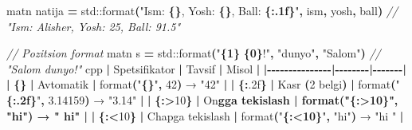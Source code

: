 \documentclass[a4paper,11pt,twoside,openright]{book}
\newenvironment{Shaded}{\begin{snugshade}}{\end{snugshade}}
\newcommand{\BuiltInTok}[1]{#1}
\newcommand{\CharTok}[1]{\textcolor[rgb]{0.31,0.60,0.02}{#1}}
\newcommand{\CommentTok}[1]{\textcolor[rgb]{0.56,0.35,0.01}{\textit{#1}}}
\newcommand{\DecValTok}[1]{\textcolor[rgb]{0.00,0.00,0.81}{#1}}
\newcommand{\ErrorTok}[1]{\textcolor[rgb]{0.64,0.00,0.00}{\textbf{#1}}}
\newcommand{\FloatTok}[1]{\textcolor[rgb]{0.00,0.00,0.81}{#1}}
\newcommand{\NormalTok}[1]{#1}
\newcommand{\OperatorTok}[1]{\textcolor[rgb]{0.81,0.36,0.00}{\textbf{#1}}}
\newcommand{\SpecialCharTok}[1]{\textcolor[rgb]{0.81,0.36,0.00}{\textbf{#1}}}
\newcommand{\StringTok}[1]{\textcolor[rgb]{0.31,0.60,0.02}{#1}}
\begin{document}
\begin{Shaded}
\begin{Highlighting}[]
\NormalTok{matn natija }\OperatorTok{=} \BuiltInTok{std::}\NormalTok{format}\OperatorTok{(}\StringTok{"Ism: }\SpecialCharTok{\{\}}\StringTok{, Yosh: }\SpecialCharTok{\{\}}\StringTok{, Ball: }\SpecialCharTok{\{:.1f\}}\StringTok{"}\OperatorTok{,}\NormalTok{ ism}\OperatorTok{,}\NormalTok{ yosh}\OperatorTok{,}\NormalTok{ ball}\OperatorTok{)}
\CommentTok{// "Ism: Alisher, Yosh: 25, Ball: 91.5"}

\CommentTok{// Pozitsion format}
\NormalTok{matn s }\OperatorTok{=} \BuiltInTok{std::}\NormalTok{format}\OperatorTok{(}\StringTok{"}\SpecialCharTok{\{1\}}\StringTok{ }\SpecialCharTok{\{0\}}\StringTok{!"}\OperatorTok{,} \StringTok{"dunyo"}\OperatorTok{,} \StringTok{"Salom"}\OperatorTok{)}
\CommentTok{// "Salom dunyo!"}
\ErrorTok{\textasciigrave{}\textasciigrave{}\textasciigrave{}}\NormalTok{cpp}
\OperatorTok{|}\NormalTok{ Spetsifikator }\OperatorTok{|}\NormalTok{ Tavsif }\OperatorTok{|}\NormalTok{ Misol }\OperatorTok{|}
\OperatorTok{|{-}{-}{-}{-}{-}{-}{-}{-}{-}{-}{-}{-}{-}{-}{-}|{-}{-}{-}{-}{-}{-}{-}{-}|{-}{-}{-}{-}{-}{-}{-}|}
\OperatorTok{|} \ErrorTok{\textasciigrave{}}\OperatorTok{\{\}}\ErrorTok{\textasciigrave{}} \OperatorTok{|}\NormalTok{ Avtomatik }\OperatorTok{|} \ErrorTok{\textasciigrave{}}\NormalTok{format}\OperatorTok{(}\StringTok{"}\SpecialCharTok{\{\}}\StringTok{"}\OperatorTok{,} \DecValTok{42}\OperatorTok{)}\ErrorTok{\textasciigrave{}}\NormalTok{ → }\ErrorTok{\textasciigrave{}}\StringTok{"42"}\ErrorTok{\textasciigrave{}} \OperatorTok{|}
\OperatorTok{|} \ErrorTok{\textasciigrave{}}\OperatorTok{\{:}\FloatTok{.2}\BuiltInTok{f}\OperatorTok{\}}\ErrorTok{\textasciigrave{}} \OperatorTok{|}\NormalTok{ Kasr }\OperatorTok{(}\DecValTok{2}\NormalTok{ belgi}\OperatorTok{)} \OperatorTok{|} \ErrorTok{\textasciigrave{}}\NormalTok{format}\OperatorTok{(}\StringTok{"}\SpecialCharTok{\{:.2f\}}\StringTok{"}\OperatorTok{,} \FloatTok{3.14159}\OperatorTok{)}\ErrorTok{\textasciigrave{}}\NormalTok{ → }\ErrorTok{\textasciigrave{}}\StringTok{"3.14"}\ErrorTok{\textasciigrave{}} \OperatorTok{|}
\OperatorTok{|} \ErrorTok{\textasciigrave{}}\OperatorTok{\{:\textgreater{}}\DecValTok{10}\OperatorTok{\}}\ErrorTok{\textasciigrave{}} \OperatorTok{|}\NormalTok{ O}\CharTok{\textquotesingle{}n}\ErrorTok{gga tekislash | \textasciigrave{}format("\{:\textgreater{}10\}", "hi")\textasciigrave{} → \textasciigrave{}"        hi"\textasciigrave{} |}
\OperatorTok{|} \ErrorTok{\textasciigrave{}}\OperatorTok{\{:\textless{}}\DecValTok{10}\OperatorTok{\}}\ErrorTok{\textasciigrave{}} \OperatorTok{|}\NormalTok{ Chapga tekislash }\OperatorTok{|} \ErrorTok{\textasciigrave{}}\NormalTok{format}\OperatorTok{(}\StringTok{"}\SpecialCharTok{\{:\textless{}10\}}\StringTok{"}\OperatorTok{,} \StringTok{"hi"}\OperatorTok{)}\ErrorTok{\textasciigrave{}}\NormalTok{ → }\ErrorTok{\textasciigrave{}}\StringTok{"hi        "}\ErrorTok{\textasciigrave{}} \OperatorTok{|}

\end{Highlighting}
\end{Shaded}
\end{document}
